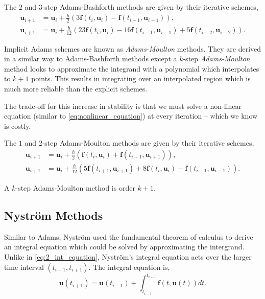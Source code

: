 \documentclass[12pt, twoside]{report}
\theoremstyle{plain}
\theoremstyle{definition}
\theoremstyle{definition}
\begin{document}
            The $2$ and $3$-step Adams-Bashforth methods are given by their 
            iterative schemes,
            \begin{align}
                \mathbf{u}_{i+1} &= \mathbf{u}_{i} + \frac{h}{2} 
                (3\mathbf{f}(t_i, \mathbf{u}_i) - 
                \mathbf{f}(t_{i-1},\mathbf{u}_{i-1}))
                \label{2_ab2},\\
                \mathbf{u}_{i+1} &= \mathbf{u}_{i} + \frac{h}{12} 
                (23\mathbf{f}(t_i, \mathbf{u}_i) - 
                16\mathbf{f}(t_{i-1},\mathbf{u}_{i-1}) + 
                5\mathbf{f}(t_{i-2}, \mathbf{u}_{i-2})) \label{2_ab3}.
            \end{align}

            Implicit Adams schemes are known as \textit{Adams-Moulton} 
            methods. They are derived in a similar way to Adams-Bashforth 
            methods except a $k$-step \textit{Adams-Moulton} method looks to 
            approximate the integrand with a polynomial which interpolates to 
            $k+1$ points. This results in integrating over an interpolated 
            region which is much more reliable than the explicit schemes. 

            The trade-off for this increase in stability is that we must solve
            a non-linear equation (similar to \eqref{eq:nonlinear_equation}) at
            every iteration -- which we know is costly.

            The $1$ and $2$-step Adams-Moulton methods are given by their 
            iterative schemes,
            \begin{align}
                \mathbf{u}_{i+1} &= \mathbf{u}_{i} + \frac{h}{2} 
                (\mathbf{f}(t_i, \mathbf{u}_i) + 
                \mathbf{f}(t_{i+1},\mathbf{u}_{i+1})),
                \label{eq:2_am1}\\
                \mathbf{u}_{i+1} &= \mathbf{u}_{i} + \frac{h}{12} 
                (5\mathbf{f}(t_{i+1}, \mathbf{u}_{i+1}) +
                8\mathbf{f}(t_{i},\mathbf{u}_{i}) -
                \mathbf{f}(t_{i-1}, \mathbf{u}_{i-1}))\label{eq:2_am2}.
            \end{align}

            A $k$-step Adams-Moulton method is order $k+1$.


        \subsection{Nystr\"om Methods}
        \label{2_nystrom}
            Similar to Adams, Nystr\"om used the fundamental theorem of 
            calculus to derive an integral equation which could be solved by
            approximating the intergrand. Unlike in \eqref{eq:2_int_equation}, 
            Nystr\"om's integral equation acts over the larger time interval
            $(t_{i-1}, t_{i+1})$. The integral equation is,
            \begin{equation}
            \label{eq:nystrom_int_equation}
                \mathbf{u}(t_{i+1}) = \mathbf{u}(t_{i-1}) 
                + \int_{t_{i-1}}^{t_{i+1}} \mathbf{f}(t, \mathbf{u}(t)) dt.
            \end{equation}
\end{document}
